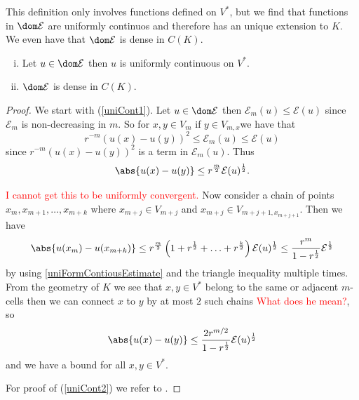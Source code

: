 This definition only involves functions defined on $V^{*}$, but we find that functions in $\dom \mathcal{E}$ are uniformly continuos and therefore has an unique extension to $K$. We even have that $\dom \mathcal{E}$ is dense in $C(K)$.
\begin{prop} \phantom{a}
	\begin{enumerate}[(i)] 
		\item 	Let $u \in \dom \mathcal{E}$ then $u$ is uniformly continuous on $V^{*}$. \label{uniCont1}
		\item $\dom \mathcal{E}$ is dense in $C(K)$. \label{uniCont2}
	\end{enumerate}
\end{prop}
\begin{proof}
	We start with (\ref{uniCont1}). Let $u \in \dom \mathcal{E}$ then $\mathcal{E}_m(u) \leq \mathcal{E}(u)$ since $\mathcal{E}_m$ is non-decreasing in $m$. So for $x,y \in V_m$ if $y \in V_{m,x}$we have that
	\begin{equation}\label{uniFormContiousEstimate}
		r^{-m}(u(x) -u(y))^{2} \leq \mathcal{E}_m(u) \leq \mathcal{E}(u)
	\end{equation}
	since $r^{-m}(u(x) -u(y))^{2}$ is a term in $\mathcal{E}_m(u)$. Thus
	\begin{equation}
		\abs{u(x)-u(y)} \leq r^{\frac{m}{2}} \mathcal{E}(u)^{\frac{1}{2}}.
	\end{equation}
	
	\textcolor{red}{I cannot get this to be uniformly convergent.}
	Now consider a chain of points $x_m, x_{m+1}, \ldots, x_{m+k}$ where $x_{m+j} \in V_{m+j}$ and $x_{m+j} \in V_{m+j+1, x_{m+j+1}}$. Then we have
	\begin{equation}
		\abs{u(x_m)-u(x_{m+k})} \leq r^{\frac{m}{2}}\left(1 + r^{\frac{1}{2}} + \ldots + r^{\frac{k}{2}}\right)\mathcal{E}(u)^{\frac{1}{2}} \leq \frac{r^{m}}{1-r^{\frac{1}{2}}} \mathcal{E}^{\frac{1}{2}}
	\end{equation}
	by using \eqref{uniFormContiousEstimate} and the triangle inequality multiple times. From the geometry of $K$ we see that $x, y \in V^{*}$ belong to the same or adjacent $m$-cells then we can connect $x$ to $y$ by at most $2$ such chains \textcolor{red}{What does he mean?}, so
	\begin{equation}
		\abs{u(x) - u(y)} \leq \frac{2r^{m/2}}{1-r^{\frac{1}{2}}} \mathcal{E}(u)^{\frac{1}{2}}
	\end{equation}
	and we have a bound for all $x,y \in V^{*}$.
	
	For proof of (\ref{uniCont2}) we refer to \cite{strichartz}.
\end{proof}


